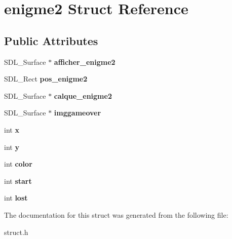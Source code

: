 \hypertarget{structenigme2}{}\section{enigme2 Struct Reference}
\label{structenigme2}
\subsection*{Public Attributes}
\begin{DoxyCompactItemize}
\item 
\mbox{\label{structenigme2_a7f54dfe9eeab40810eab226a12fa2208}} 
S\+D\+L\+\_\+\+Surface $\ast$ {\bfseries afficher\+\_\+enigme2}
\item 
\mbox{\label{structenigme2_a0b945b1fae00493bccfb8c2b16ee2b78}} 
S\+D\+L\+\_\+\+Rect {\bfseries pos\+\_\+enigme2}
\item 
\mbox{\label{structenigme2_aafa4500b064319895e2eb03c24cc1a8a}} 
S\+D\+L\+\_\+\+Surface $\ast$ {\bfseries calque\+\_\+enigme2}
\item 
\mbox{\label{structenigme2_ae0469410e9ec8e60cf0204252cca0b82}} 
S\+D\+L\+\_\+\+Surface $\ast$ {\bfseries imggameover}
\item 
\mbox{\label{structenigme2_a422d435047e30ae7577a8e238f61668e}} 
int {\bfseries x}
\item 
\mbox{\label{structenigme2_aac3138bd43564620b75c50bf20125fca}} 
int {\bfseries y}
\item 
\mbox{\label{structenigme2_aed1d6a6bbdfbbeb0d6ac98046d92add1}} 
int {\bfseries color}
\item 
\mbox{\label{structenigme2_a46fc61f86e8d3f8a331a221985058b82}} 
int {\bfseries start}
\item 
\mbox{\label{structenigme2_a66e610e52aa383391ba8198a25b21caa}} 
int {\bfseries lost}
\end{DoxyCompactItemize}


The documentation for this struct was generated from the following file\+:\begin{DoxyCompactItemize}
\item 
struct.\+h\end{DoxyCompactItemize}
